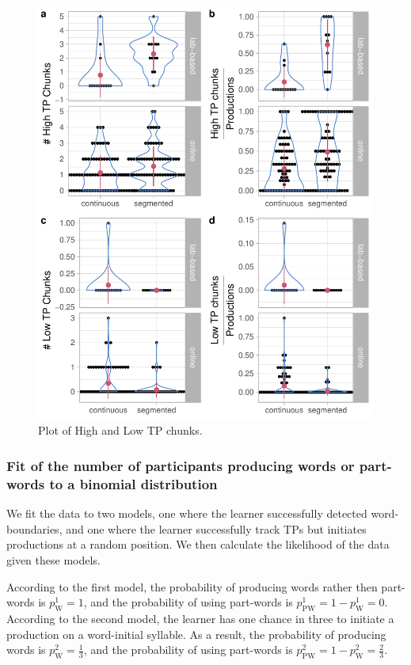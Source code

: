 \documentclass[
]{article}
\begin{document}
\begin{figure}

{\centering \includegraphics[width=0.8\linewidth]{segmentation_recall_combined_for_revision_files/figure-latex/recall-tp-chunks-raw-plot-1} 

}

\caption{Plot of High and Low TP chunks.}\label{fig:recall-tp-chunks-raw-plot}
\end{figure}

\clearpage

\hypertarget{fit-of-the-number-of-participants-producing-words-or-part-words-to-a-binomial-distribution}{%
\subsubsection{Fit of the number of participants producing words or
part-words to a binomial
distribution}\label{fit-of-the-number-of-participants-producing-words-or-part-words-to-a-binomial-distribution}}

We fit the data to two models, one where the learner successfully
detected word-boundaries, and one where the learner successfully track
TPs but initiates productions at a random position. We then calculate
the likelihood of the data given these models.

According to the first model, the probability of producing words rather
then part-words is \(p^1_{\text{W}} = 1\), and the probability of using
part-words is \(p^1_{\text{PW}} = 1 - p^1_{\text{W}} = 0\). According to
the second model, the learner has one chance in three to initiate a
production on a word-initial syllable. As a result, the probability of
producing words is \(p^2_{\text{W}} = \frac{1}{3}\), and the probability
of using part-words is
\(p^2_{\text{PW}} = 1 - p^2_{\text{W}} = \frac{2}{3}\).
\end{document}
